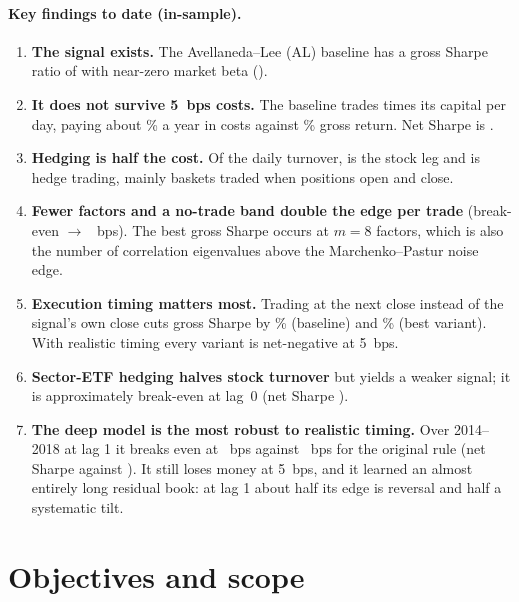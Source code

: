 \documentclass[11pt,a4paper]{article}
\begin{document}
\paragraph{Key findings to date (in-sample).}
\begin{enumerate}
  \item \textbf{The signal exists.} The Avellaneda--Lee (AL) baseline has a gross Sharpe ratio of
        \MPBaseGrossSR{} with near-zero market beta (\MPBetaBase{}).
  \item \textbf{It does not survive 5~bps costs.} The baseline trades \BaseTurnover{} times its
        capital per day, paying about \MPBaseCostAnn\% a year in costs against \MPBaseGrossAnn\% gross
        return. Net Sharpe is \MPBaseNetSR{}.
  \item \textbf{Hedging is half the cost.} Of the daily turnover, \BaseStockLegTurnover{} is the
        stock leg and \BaseHedgeTurnover{} is hedge trading, mainly baskets traded when positions
        open and close.
  \item \textbf{Fewer factors and a no-trade band double the edge per trade} (break-even
        \MPBaseBE{} $\to$ \MPBestBE{}~bps). The best gross Sharpe occurs at $m=8$ factors, which is also
        the number of correlation eigenvalues above the Marchenko--Pastur noise edge.
  \item \textbf{Execution timing matters most.} Trading at the next close instead of the
        signal's own close cuts gross Sharpe by \MPLagLossBase\% (baseline) and \MPLagLossBest\% (best
        variant). With realistic timing every variant is net-negative at 5~bps.
  \item \textbf{Sector-ETF hedging halves stock turnover} but yields a weaker signal; it is
        approximately break-even at lag~0 (net Sharpe \MPETFNetSR{}).
  \item \textbf{The deep model is the most robust to realistic timing.} Over 2014--2018 at lag 1 it
        breaks even at \DeepLagBE~bps against \ALDeepYearsLagBE~bps for the original rule (net Sharpe
        \DeepLagNetSR{} against \ALDeepYearsLagNetSR). It still loses money at 5~bps, and it learned
        an almost entirely long residual book: at lag 1 about half its edge is reversal and half a
        systematic tilt.
\end{enumerate}

\section{Objectives and scope}
\label{sec:objectives}
\end{document}
